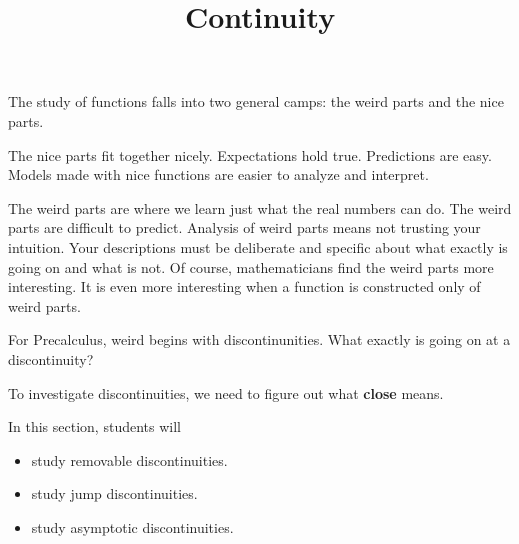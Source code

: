 \documentclass{ximera}
\title{Continuity}
\begin{document}
\begin{abstract}
\end{abstract}
\maketitle






The study of functions falls into two general camps: the weird parts and the nice parts.  

The nice parts fit together nicely. Expectations hold true. Predictions are easy. Models made with nice functions are easier to analyze and interpret.


The weird parts are where we learn just what the real numbers can do.  The weird parts are difficult to predict. Analysis of weird parts means not trusting your intuition.  Your descriptions must be deliberate and specific about what exactly is going on and what is not.  Of course, mathematicians find the weird parts more interesting.  It is even more interesting when a function is constructed only of weird parts.


For Precalculus, weird begins with discontinunities.  What exactly is going on at a discontinuity?


To investigate discontinuities, we need to figure out what \textbf{close} means.
































\begin{sectionOutcomes}
In this section, students will 

\begin{itemize}
\item study removable discontinuities.
\item study jump discontinuities.
\item study asymptotic discontinuities.

\end{itemize}
\end{sectionOutcomes}
\end{document}
